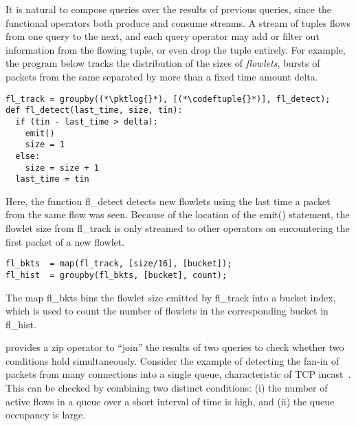 It is natural to compose queries over the results of previous queries, since the
functional operators both produce and consume streams. A stream of tuples flows
from one query to the next, and each query operator may add or filter out
information from the flowing tuple, or even drop the tuple entirely. For
example, the program below tracks the distribution of the sizes of {\em
  flowlets}, \ie bursts of packets from the same \txtftuple separated by more
than a fixed time amount {\ct delta}.%
\begin{lstlisting}
fl_track = groupby((*\pktlog{}*), [(*\codeftuple{}*)], fl_detect);
def fl_detect(last_time, size, tin):
  if (tin - last_time > delta):
    emit()
    size = 1
  else:
    size = size + 1
  last_time = tin
\end{lstlisting}
Here, the function {\ct fl\_detect} detects new flowlets using the last time a
packet from the same flow was seen. Because of the location of the {\ct emit()}
statement, the flowlet size from {\ct fl\_track} is only streamed to other
operators on encountering the first packet of a new flowlet.
\begin{lstlisting}
fl_bkts  = map(fl_track, [size/16], [bucket]);
fl_hist  = groupby(fl_bkts, [bucket], count);
\end{lstlisting}
The map {\ct fl\_bkts} bins the flowlet size emitted by {\ct fl\_track} into a
bucket index, which is used to count the number of flowlets in the corresponding
bucket in {\ct fl\_hist}.

 \TheSystem provides a {\ct zip} operator
to ``join'' the results of two queries to check whether two conditions hold
simultaneously. Consider the example of detecting the fan-in of packets from
many connections into a single queue, characteristic of TCP
incast~\cite{tcpincast}. This can be checked by combining two distinct
conditions: (i) the number of active flows in a queue over a short interval of
time is high, and (ii) the queue occupancy is large.

